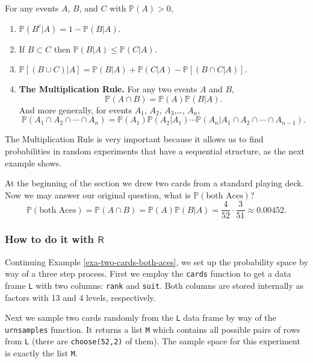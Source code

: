 \begin{prop}
For any events \(A\), \(B\), and \(C\) with \(\mathbb{P}(A)>0\),
\begin{enumerate}
\item \( \mathbb{P} ( B^{c} | A ) = 1 - \mathbb{P} (B|A).\)
\item If \(B\subset C\) then \(\mathbb{P}(B|A)\leq\mathbb{P}(C|A)\).
\item \( \mathbb{P} [ ( B\cup C ) | A ] = \mathbb{P} (B|A) +
   \mathbb{P}(C|A) - \mathbb{P} [ (B \cap C|A) ].\)
\item \textbf{The Multiplication Rule.} For any two events \(A\) and \(B\),
\begin{equation}
\label{eq-multiplication-rule-short}
\mathbb{P}(A\cap B)=\mathbb{P}(A)\mathbb{P}(B|A).
\end{equation}
And more generally, for events \(A_{1}\), \(A_{2}\), \(A_{3}\),\ldots{},
\(A_{n}\),
\begin{equation}
\label{eq-multiplication-rule-long}
\mathbb{P}(A_{1}\cap A_{2}\cap\cdots\cap A_{n})=\mathbb{P}(A_{1})\mathbb{P}(A_{2}|A_{1})\cdots\mathbb{P}(A_{n}|A_{1}\cap A_{2}\cap\cdots\cap A_{n-1}).
\end{equation}
\end{enumerate}
\end{prop}
The Multiplication Rule is very important because it allows us to find
probabilities in random experiments that have a sequential structure,
as the next example shows.

\label{exa-two-cards-both-aces} At the beginning of the section we drew
two cards from a standard playing deck. Now we may answer our original
question, what is \(\mathbb{P}(\mbox{both Aces})\)?  \[
\mathbb{P}(\mbox{both Aces})=\mathbb{P}(A\cap
B)=\mathbb{P}(A)\mathbb{P}(B|A)=\frac{4}{52}\cdot\frac{3}{51}\approx0.00452.
\]

\subsubsection{How to do it with \(\mathsf{R}\)}
\label{sec-4-6-2-1}

Continuing Example \ref{exa-two-cards-both-aces}, we set up the probability
space by way of a three step process. First we employ the \texttt{cards}
function to get a data frame \texttt{L} with two columns: \texttt{rank} and
\texttt{suit}. Both columns are stored internally as factors with 13 and 4
levels, respectively.

Next we sample two cards randomly from the \texttt{L} data frame by way of
the \texttt{urnsamples} function. It returns a list \texttt{M} which contains all
possible pairs of rows from \texttt{L} (there are \texttt{choose(52,2)} of
them). The sample space for this experiment is exactly the list \texttt{M}.


